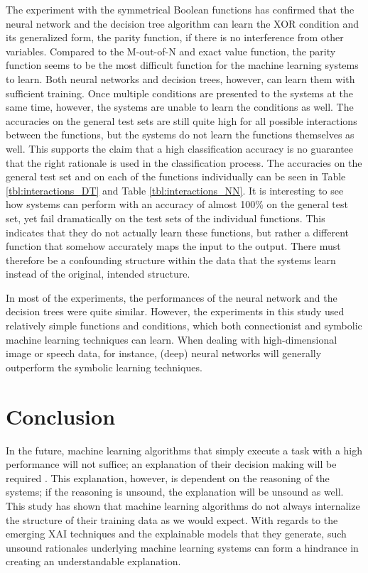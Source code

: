 \documentclass[letterpaper]{article} %
\begin{document}
The experiment with the symmetrical Boolean functions has confirmed that the neural network and the decision tree algorithm can learn the XOR condition and its generalized form, the parity function, if there is no interference from other variables. Compared to the M-out-of-N and exact value function, the parity function seems to be the most difficult function for the machine learning systems to learn. Both neural networks and decision trees, however, can learn them with sufficient training. Once multiple conditions are presented to the systems at the same time, however, the systems are unable to learn the conditions as well. The accuracies on the general test sets are still quite high for all possible interactions between the functions, but the systems do not learn the functions themselves as well. This supports the claim that a high classification accuracy is no guarantee that the right rationale is used in the classification process. The accuracies on the general test set and on each of the functions individually can be seen in Table \ref{tbl:interactions_DT} and Table \ref{tbl:interactions_NN}. It is interesting to see how systems can perform with an accuracy of almost 100\% on the general test set, yet fail dramatically on the test sets of the individual functions. This indicates that they do not actually learn these functions, but rather a different function that somehow accurately maps the input to the output. There must therefore be a confounding structure within the data that the systems learn instead of the original, intended structure. 

In most of the experiments, the performances of the neural network and the decision trees were quite similar. %
However, the experiments in this study used relatively simple functions and conditions, which both connectionist and symbolic machine learning techniques can learn. When dealing with high-dimensional image or speech data, for instance, (deep) neural networks will generally outperform the symbolic learning techniques. %

\section{Conclusion}
\noindent In the future, machine learning algorithms that simply execute a task with a high performance will not suffice; an explanation of their decision making will be required \cite{gunning2017explainable}. This explanation, however, is dependent on the reasoning of the systems; if the reasoning is unsound, the explanation will be unsound as well. This study has shown that machine learning algorithms do not always internalize the structure of their training data as we would expect. With regards to the emerging XAI techniques and the explainable models that they generate, such unsound rationales underlying machine learning systems can form a hindrance in creating an understandable explanation. 




\end{document}
